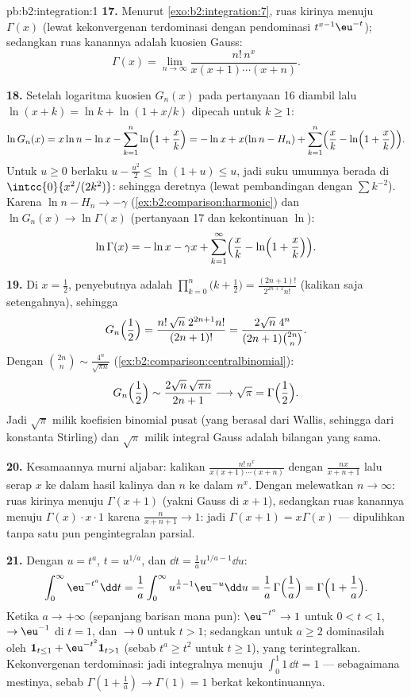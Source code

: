 \begin{solution}{pb:b2:integration:1}
\textbf{17.} Menurut \cref{exo:b2:integration:7}, ruas kirinya menuju
$\Gamma(x)$ (lewat kekonvergenan terdominasi dengan pendominasi
$t^{x-1}\eu^{-t}$); sedangkan ruas kanannya adalah kuosien Gauss:
\[
\Gamma(x) = \lim_{n\to\infty}
\frac{n!\,n^x}{x(x+1)\cdots(x+n)} .
\]

\textbf{18.} Setelah logaritma kuosien $G_n(x)$ pada pertanyaan 16
diambil lalu $\ln(x+k) = \ln k + \ln(1 + x/k)$ dipecah untuk $k
\geq 1$:
\[
\ln G_n(x) = x\ln n - \ln x - \sum_{k=1}^n
\ln\Bigl(1+\frac xk\Bigr)
= -\ln x + x(\ln n - H_n)
+ \sum_{k=1}^n\Bigl(\frac xk -
\ln\Bigl(1+\frac xk\Bigr)\Bigr).
\]
Untuk $u \geq 0$ berlaku $u - \frac{u^2}2 \leq \ln(1+u) \leq u$, jadi
suku umumnya berada di $\intcc{0}{x^2/(2k^2)}$: sehingga deretnya
 (lewat pembandingan dengan $\sum k^{-2}$). Karena $\ln n - H_n
\to -\gamma$ (\cref{ex:b2:comparison:harmonic}) dan $\ln G_n(x)
\to \ln\Gamma(x)$ (pertanyaan 17 dan kekontinuan $\ln$):
\[
\ln\Gamma(x) = -\ln x - \gamma x
+ \sum_{k=1}^\infty\Bigl(\frac xk -
\ln\Bigl(1+\frac xk\Bigr)\Bigr) .
\]

\textbf{19.} Di $x = \frac12$, penyebutnya adalah
$\prod_{k=0}^n\bigl(k+\frac12\bigr) =
\frac{(2n+1)!}{2^{2n+1}n!}$ (kalikan saja setengahnya), sehingga
\[
G_n\Bigl(\frac12\Bigr)
= \frac{n!\,\sqrt n\;2^{2n+1}n!}{(2n+1)!}
= \frac{2\sqrt n\;4^n}{(2n+1)\binom{2n}{n}} .
\]
Dengan $\binom{2n}{n} \sim \frac{4^n}{\sqrt{\pi n}}$
(\cref{ex:b2:comparison:centralbinomial}):
\[
G_n\Bigl(\frac12\Bigr)
\sim \frac{2\sqrt n\,\sqrt{\pi n}}{2n+1}
\longrightarrow \sqrt\pi = \Gamma\Bigl(\frac12\Bigr) .
\]
Jadi $\sqrt\pi$ milik koefisien binomial pusat (yang berasal dari
Wallis, sehingga dari konstanta Stirling) dan $\sqrt\pi$ milik integral
Gauss adalah bilangan yang sama.

\textbf{20.} Kesamaannya murni aljabar: kalikan
$\frac{n!\,n^x}{x(x+1)\cdots(x+n)}$ dengan $\frac{nx}{x+n+1}$ lalu
serap $x$ ke dalam hasil kalinya dan $n$ ke dalam $n^x$. Dengan
melewatkan $n \to \infty$: ruas kirinya menuju $\Gamma(x+1)$ (yakni
Gauss di $x+1$), sedangkan ruas kanannya menuju $\Gamma(x)\cdot x\cdot
1$ karena $\frac{n}{x+n+1} \to 1$: jadi $\Gamma(x+1) = x\Gamma(x)$ ---
dipulihkan tanpa satu pun pengintegralan parsial.

\textbf{21.} Dengan $u = t^a$, $t = u^{1/a}$, dan $\dd t = \frac1a
u^{1/a - 1}\dd u$:
\[
\int_0^\infty \eu^{-t^a}\dd t
= \frac1a\int_0^\infty u^{\frac1a - 1}\eu^{-u}\dd u
= \frac1a\,\Gamma\Bigl(\frac1a\Bigr)
= \Gamma\Bigl(1 + \frac1a\Bigr) .
\]
Ketika $a \to +\infty$ (sepanjang barisan mana pun): $\eu^{-t^a} \to 1$
untuk $0 < t < 1$, $\to \eu^{-1}$ di $t = 1$, dan $\to 0$ untuk $t > 1$;
sedangkan untuk $a \geq 2$ dominasilah oleh $\mathbf 1_{t \leq 1} +
\eu^{-t^2}\mathbf 1_{t > 1}$ (sebab $t^a \geq t^2$ untuk $t \geq 1$),
yang terintegralkan. Kekonvergenan terdominasi: jadi integralnya menuju
$\int_0^1 1\,\dd t = 1$ --- sebagaimana mestinya, sebab $\Gamma(1 +
\frac1a) \to \Gamma(1) = 1$ berkat kekontinuannya.


\end{solution}
